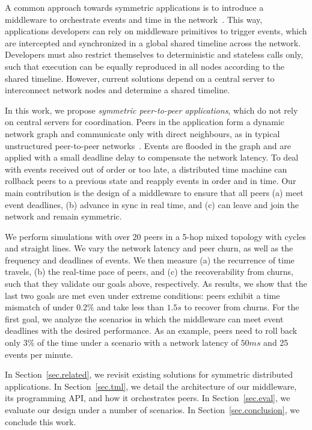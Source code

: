 \documentclass[sn-mathphys,iicol]{sn-jnl}%
\begin{document}
A common approach towards symmetric applications is to introduce a middleware
to orchestrate events and time in the network~\cite{gals,croquet}.
This way, applications developers can rely on middleware primitives to trigger
events, which are intercepted and synchronized in a global shared timeline
across the network.
Developers must also restrict themselves to deterministic and stateless calls
only, such that execution can be equally reproduced in all nodes according to
the shared timeline. %
However, current solutions depend on a central server to interconnect network
nodes and determine a shared timeline.

In this work, we propose \emph{symmetric peer-to-peer applications}, which
do not rely on central servers for coordination.
Peers in the application form a dynamic network graph and communicate only
with direct neighbours, as in typical unstructured peer-to-peer
networks~\cite{p2p.survey}.
Events are flooded in the graph and are applied with a small deadline delay to
compensate the network latency.
To deal with events received out of order or too late, a distributed time
machine can rollback peers to a previous state and reapply events in order and
in time.
Our main contribution is the design of a middleware to ensure that all peers
    (a) meet event deadlines,
    (b) advance in sync in real time, and
    (c) can leave and join the network and remain symmetric.

We perform simulations with over 20 peers in a 5-hop mixed topology with cycles
and straight lines.
We vary the network latency and peer churn, as well as the frequency and
deadlines of events.
%
We then measure (a) the recurrence of time travels, (b) the real-time pace of
peers, and (c) the recoverability from churns, such that they validate our
goals above, respectively.
%
As results, we show that the last two goals are met even under extreme
conditions: peers exhibit a time mismatch of under $0.2\%$ and take less than
$1.5s$ to recover from churns.
%
For the first goal, we analyze the scenarios in which the middleware can meet
event deadlines with the desired performance.
As an example, peers need to roll back only $3\%$ of the time under a scenario
with a network latency of $50ms$ and 25 events per minute.

In Section~\ref{sec.related}, we revisit existing solutions for symmetric
distributed applications.
In Section~\ref{sec.tml}, we detail the architecture of our middleware, its
programming API, and how it orchestrates peers.
In Section~\ref{sec.eval}, we evaluate our design under a number of scenarios.
In Section~\ref{sec.conclusion}, we conclude this work.
\end{document}
